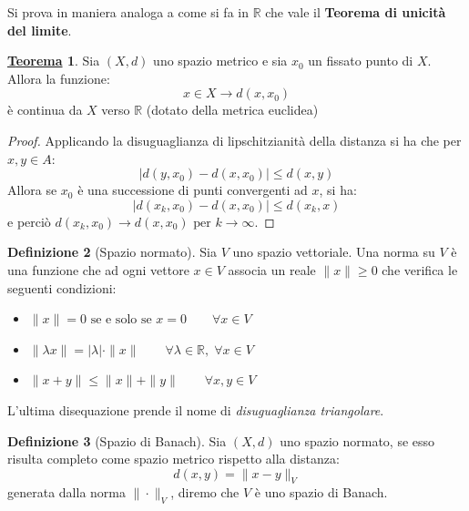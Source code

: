 \documentclass[a4paper,twoside]{article}
\newcommand{\R}{\mathbb{R}}
\theoremstyle{definition}
\newtheorem{theorem}{\color{Red}\underline{\textrm Teorema}}
\newtheorem{definizione}[theorem]{Definizione}
\numberwithin{theorem}{section}
\begin{document}
Si prova in maniera analoga a come si fa in $\R$ che vale il \textbf{Teorema di unicità del limite}.
\begin{theorem}
Sia $(X,d)$ uno spazio metrico e sia $x_0$ un fissato punto di $X$. Allora la funzione: $$x\in X\to d(x,x_0)$$
è continua da $X$ verso $\R$ (dotato della metrica euclidea)
\end{theorem}
\begin{proof}
    Applicando la disuguaglianza di lipschitzianità della distanza si ha che per $x,y\in A$:
    $$|d(y,x_0)-d(x,x_0)|\leq d(x,y)$$
    Allora se $x_0$ è una successione di punti convergenti ad $x$, si ha: 
    $$|d(x_k,x_0)-d(x,x_0)|\leq d(x_k,x)$$
    e perciò $d(x_k,x_0)\to d(x,x_0)\text{ per } k\to\infty$.
\end{proof}
\begin{definizione}[Spazio normato]
Sia $V$ uno spazio vettoriale. Una norma su $V$ è una funzione che ad ogni vettore $x\in V$ associa un reale $\|x\|\geq 0$ che verifica le seguenti condizioni:
\begin{itemize}
    \item $\|x\|=0 \text{ se e solo se } x=0 \qquad \forall x\in V$
    \item $\|\lambda x\|=|\lambda|\cdot\|x\|\qquad \forall\lambda\in\R,\; \forall x\in V$
    \item $\|x+y\|\leq \|x\|+\|y\|\qquad \forall x,y\in V$
\end{itemize}
\end{definizione}
L'ultima disequazione prende il nome di \emph{disuguaglianza triangolare}.
\begin{definizione}[Spazio di Banach]
Sia $(X,d)$ uno spazio normato, se esso risulta completo come spazio metrico rispetto alla distanza: $$d(x,y)=\|x-y\|_V$$ generata dalla norma $\|\cdot\|_V$, diremo che $V$ è uno spazio di Banach.    
\end{definizione}
\end{document}
